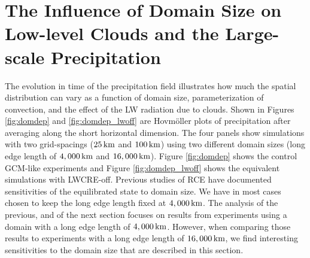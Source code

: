 \documentclass[draft]{agujournal2019}
\begin{document}
\section{The Influence of Domain Size on Low-level Clouds and the Large-scale Precipitation}


The evolution in time of the precipitation field illustrates how much the spatial distribution can vary as a 
function of domain size, parameterization of convection, and the effect of the LW radiation due to clouds. 
Shown in Figures {\ref{fig:domdep}} and {\ref{fig:domdep_lwoff}} are Hovm{\"o}ller plots of precipitation after 
averaging along the short horizontal dimension.  The four panels show simulations with two grid-spacings 
($25\, \rm{km}$ and $100\, \rm{km}$) using two different domain sizes (long edge length of $4,000\, \rm{km}$ and $16,000\, \rm{km}$).
Figure {\ref{fig:domdep}} shows the control GCM-like experiments and Figure  {\ref{fig:domdep_lwoff}} shows the equivalent simulations with LWCRE-off.    
 Previous studies of RCE
\cite{Bretherton_etal_2005, Bretherton_etal_2006, Muller2012, Jeevanjee2013, Silvers_etal_2016, Dixit_etal_2018, Patrizio_Randall_2019}
have documented sensitivities of the equilibrated state to domain size.  
We have in most cases chosen to keep the long edge length fixed at $4,000\, \rm{km}$. 
The analysis of the previous, and of the next section focuses on results from 
experiments using a domain with a long edge length of $4,000 \, \rm{km}$.  However, when comparing those results
to experiments with a long edge length of $16,000 \, \rm{km}$, we find interesting sensitivities to the domain size that are described in this section. 
\end{document}
